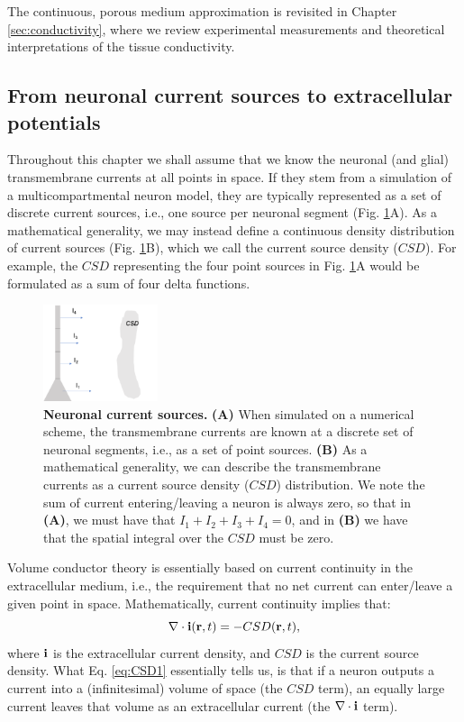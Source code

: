 The continuous, porous medium approximation is revisited in Chapter \ref{sec:conductivity}, where we review experimental measurements and theoretical interpretations of the tissue conductivity.


\subsection{From neuronal current sources to extracellular potentials}
\label{sec:continuous}
Throughout this chapter we shall assume that we know the neuronal (and glial) transmembrane currents at all points in space. If they stem from a simulation of a multicompartmental neuron model, they are typically represented as a set of discrete current sources, i.e., one source per neuronal segment (Fig. \ref{VC:fig:CSD}A). As a mathematical generality, we may instead define a continuous density distribution of current sources (Fig. \ref{VC:fig:CSD}B), which we call the current source density ($CSD$). For example, the $CSD$ representing the four point sources in Fig. \ref{VC:fig:CSD}A would be formulated as a sum of four delta functions. 

\begin{figure}[!ht]
\begin{center}
\includegraphics[width=0.3\textwidth]{Figures/VC/CSD.png}
\end{center}
\caption{\textbf{Neuronal current sources.}  {\bf (A)} When simulated on a numerical scheme, the transmembrane currents are known at a discrete set of neuronal segments, i.e., as a set of point sources.  {\bf (B)} As a mathematical generality, we can describe the transmembrane currents as a current source density ($CSD$) distribution. We note the sum of current entering/leaving a neuron is always zero, so that in {\bf (A)}, we must have that $I_1 + I_2 + I_3 + I_4 = 0$, and in {\bf (B)} we have that the spatial integral over the $CSD$ must be zero.
}
\label{VC:fig:CSD}
\end{figure}
Volume conductor theory is essentially based on current continuity in the extracellular medium, i.e., the requirement that no net current can enter/leave a given point in space. Mathematically, current continuity implies that:
\begin{equation}
\nabla \cdot {\bf i}({\bf r}, t) = - CSD({\bf r}, t),
\label{eq:CSD1}
\end{equation}
where ${\bf i}$ is the extracellular current density, and $CSD$ is the current source density. What Eq. \ref{eq:CSD1} essentially tells us, is that if a neuron outputs a current into a (infinitesimal) volume of space (the $CSD$ term), an equally large current leaves that volume as an extracellular current (the $\nabla \cdot {\bf i}$ term).


